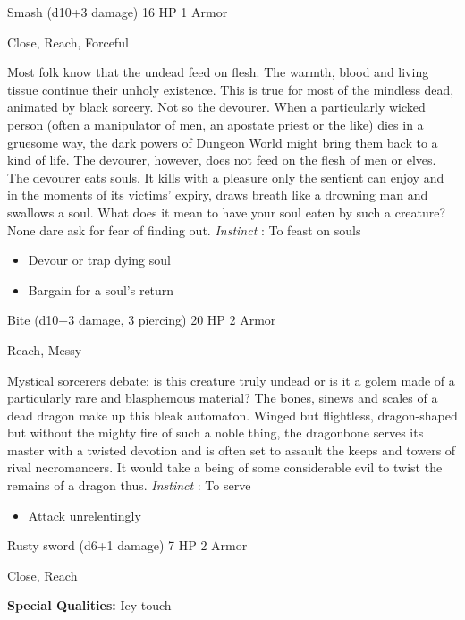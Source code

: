 

 Smash (d10+3 damage) 16 HP 1 Armor


 Close, Reach, Forceful


 Most folk know that the undead feed on flesh. The warmth, blood and living tissue continue their unholy existence. This is true for most of the mindless dead, animated by black sorcery. Not so the devourer. When a particularly wicked person (often a manipulator of men, an apostate priest or the like) dies in a gruesome way, the dark powers of Dungeon World might bring them back to a kind of life. The devourer, however, does not feed on the flesh of men or elves. The devourer eats souls. It kills with a pleasure only the sentient can enjoy and in the moments of its victims' expiry, draws breath like a drowning man and swallows a soul. What does it mean to have your soul eaten by such a creature? None dare ask for fear of finding out. \emph{Instinct}
: To feast on souls
\begin{itemize}
\item Devour or trap dying soul
\item Bargain for a soul's return

\end{itemize}




 Bite (d10+3 damage, 3 piercing) 20 HP 2 Armor


 Reach, Messy


 Mystical sorcerers debate: is this creature truly undead or is it a golem made of a particularly rare and blasphemous material? The bones, sinews and scales of a dead dragon make up this bleak automaton. Winged but flightless, dragon-shaped but without the mighty fire of such a noble thing, the dragonbone serves its master with a twisted devotion and is often set to assault the keeps and towers of rival necromancers. It would take a being of some considerable evil to twist the remains of a dragon thus. \emph{Instinct}
: To serve
\begin{itemize}
\item Attack unrelentingly

\end{itemize}




 Rusty sword (d6+1 damage) 7 HP 2 Armor


 Close, Reach


 \textbf{Special Qualities:}
 Icy touch


